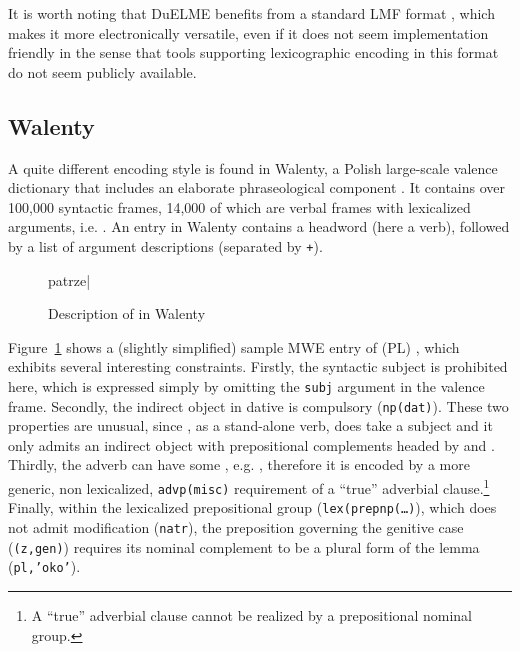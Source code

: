 \documentclass[output=paper]{langsci/langscibook}
\begin{document}
It is worth noting that DuELME benefits from a standard LMF format \citep{odijk:13}, which makes it more electronically versatile, even if it does not seem implementation friendly in the sense that tools supporting lexicographic encoding in this format do not seem publicly available.

\subsection{Walenty}
\label{lic:sec:walenty}

A quite different encoding style is found in Walenty, a Polish large-scale valence dictionary that includes an elaborate phraseological component \citep{prz:etal:14b,prz:etal:16}. It contains over 100,000 syntactic frames, 14,000 of which are verbal frames with lexicalized arguments, i.e. . An entry in Walenty contains a headword (here a verb), followed by a list of argument descriptions (separated by \texttt{+}).

\begin{figure}[th]
\begin{duelme}
patrze|%
\end{duelme}
  \caption{Description of  in Walenty}
  \label{lic:fig:patrzy:walenty}
\end{figure}

Figure~\ref{lic:fig:patrzy:walenty} shows a (slightly simplified) sample MWE entry of (PL) , which exhibits several interesting constraints. Firstly, the syntactic subject is prohibited here, which is expressed simply by omitting the \texttt{subj} argument in the valence frame. Secondly, the indirect object in dative is compulsory (\texttt{np(dat)}). These two properties are unusual, since , as a stand-alone verb, does take a subject and it only admits an indirect object with prepositional complements headed by  and . Thirdly, the adverb  can have some , e.g. , therefore it is encoded by a more generic, non lexicalized, \texttt{advp(misc)} requirement of a ``true'' adverbial clause.\footnote{A ``true'' adverbial clause cannot be realized by a prepositional nominal group.} 
Finally, within the lexicalized prepositional group (\texttt{lex(prepnp(\ldots)}), which does not admit modification (\texttt{natr}), the preposition  governing the genitive case (\texttt{(z,gen)}) requires its nominal complement to be a plural form of the lemma  (\texttt{pl,'oko'}).
\end{document}

